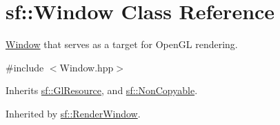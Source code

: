 \hypertarget{classsf_1_1_window}{\section{sf\+:\+:Window Class Reference}
\label{classsf_1_1_window}
}


\hyperlink{classsf_1_1_window}{Window} that serves as a target for Open\+G\+L rendering.  




{\ttfamily \#include $<$Window.\+hpp$>$}



Inherits \hyperlink{classsf_1_1_gl_resource}{sf\+::\+Gl\+Resource}, and \hyperlink{classsf_1_1_non_copyable}{sf\+::\+Non\+Copyable}.



Inherited by \hyperlink{classsf_1_1_render_window}{sf\+::\+Render\+Window}.

